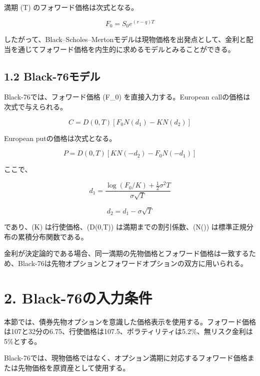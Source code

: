 \documentclass[
  letterpaper,
  DIV=11,
  numbers=noendperiod]{scrreprt}
\begin{document}
満期 (T) のフォワード価格は次式となる。

\[
F_0
=
S_0 e^{(r-q)T}
\]

したがって、Black--Scholes--Mertonモデルは現物価格を出発点として、金利と配当を通じてフォワード価格を内生的に求めるモデルとみることができる。

\subsection{1.2 Black-76モデル}\label{black-76ux30e2ux30c7ux30eb}

Black-76では、フォワード価格 (F\_0) を直接入力する。European
callの価格は次式で与えられる。

\[
C
=
D(0,T)
\left[
F_0N(d_1)-KN(d_2)
\right]
\]

European putの価格は次式となる。

\[
P
=
D(0,T)
\left[
KN(-d_2)-F_0N(-d_1)
\right]
\]

ここで、

\[
d_1
=
\frac{
\log(F_0/K)+\frac{1}{2}\sigma^2T
}{
\sigma\sqrt{T}
}
\]

\[
d_2
=
d_1-\sigma\sqrt{T}
\]

であり、(K) は行使価格、(D(0,T)) は満期までの割引係数、(N(\cdot))
は標準正規分布の累積分布関数である。

金利が決定論的である場合、同一満期の先物価格とフォワード価格は一致するため、Black-76は先物オプションとフォワードオプションの双方に用いられる。

\section{2.
Black-76の入力条件}\label{black-76ux306eux5165ux529bux6761ux4ef6}

本節では、債券先物オプションを意識した価格表示を使用する。フォワード価格は107と32分の6.75、行使価格は107.5、ボラティリティは5.2\%、無リスク金利は5\%とする。

Black-76では、現物価格ではなく、オプション満期に対応するフォワード価格または先物価格を原資産として使用する。
\end{document}
